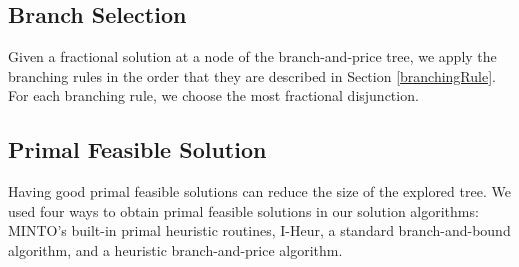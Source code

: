 \subsection{Branch Selection}
Given a fractional solution at a node of the branch-and-price tree, we apply the branching
rules in the order that they are described in Section \ref{branchingRule}. For each 
branching rule, we choose the most fractional disjunction. 

\subsection{Primal Feasible Solution}
\label{sec:primal-feas}
Having good primal feasible solutions can reduce the size of the explored tree.  
We used four ways to obtain primal feasible solutions in our solution 
algorithms: MINTO's built-in primal heuristic routines, I-Heur,
a standard branch-and-bound algorithm, and a heuristic branch-and-price algorithm.

